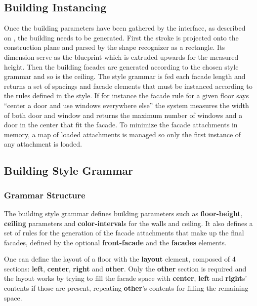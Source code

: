 

\subsection{Building Instancing}

Once the building parameters have been gathered by the interface, as described on ,
the building needs to be generated.
First the stroke is projected onto the construction plane and parsed by the shape recognizer as a rectangle.
Its dimension serve as the blueprint which is extruded upwards for the measured height.
Then the building facades are generated according to the chosen style grammar and so is the ceiling.
The style grammar is fed each facade length and returns a set of spacings and facade elements that must be instanced
according to the rules defined in the style.
If for instance the facade rule for a given floor says
``center a door and use windows everywhere else'' the system measures the width of both door and window and returns
the maximum number of windows and a door in the center that fit the facade.
To minimize the facade attachments in memory, a map of loaded attachments is managed so only the first instance of any
attachment is loaded.


\subsection{Building Style Grammar}

\subsubsection{Grammar Structure}

The building style grammar defines building parameters such as
\textbf{floor-height}, \textbf{ceiling} parameters and \textbf{color-interval}s for the walls and ceiling.
It also defines a set of rules for the generation of the facade attachments that make up the final facades,
defined by the optional \textbf{front-facade} and the \textbf{facades} elements.

One can define the layout of a floor with the \textbf{layout} element, composed of 4 sections:
\textbf{left}, \textbf{center}, \textbf{right} and \textbf{other}.
Only the \textbf{other} section is required and the layout works by trying to fill the facade space with \textbf{center}, \textbf{left} and \textbf{right}s' contents if those are present, repeating \textbf{other}'s contents for filling the remaining space.

